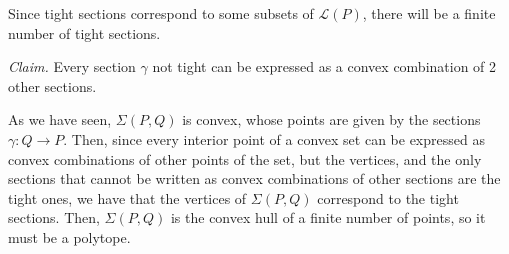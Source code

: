 \documentclass[12pt,a4paper]{article}
\begin{document}
Since tight sections correspond to some subsets of $\mathcal{L}\left(P\right)$, there will be a finite number of tight sections.

\textit{Claim.} Every section $\gamma$ not tight can be expressed as a convex combination of 2 other sections.

As we have seen, $\Sigma\left(P,Q\right)$ is convex, whose points are given by the sections $\gamma\colon Q\to P$. Then, since every interior point of a convex set can be expressed as convex combinations of other points of the set, but the vertices, and the only sections that cannot be written as convex combinations of other sections are the tight ones, we have that the vertices of $\Sigma\left(P,Q\right)$ correspond to the tight sections. Then, $\Sigma\left(P,Q\right)$ is the convex hull of a finite number of points, so it must be a polytope.

\end{document}
